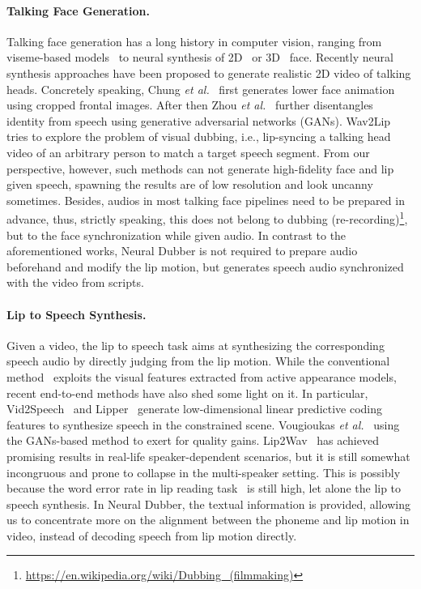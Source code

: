 \documentclass{article}
\begin{document}
\paragraph{Talking Face Generation.}
Talking face generation has a long history in computer vision, ranging from viseme-based models~\cite{edwards2016jali, zhou2018visemenet} to neural synthesis of 2D~\cite{suwajanakorn2017synthesizing, thies2020neural, wiles2018x2face} or 3D~\cite{karras2017audio, richard2021meshtalk, taylor2017deep} face. Recently neural synthesis approaches have been proposed to generate realistic 2D video of talking heads. Concretely speaking, Chung \textit{et al.}~\cite{chung2017you} first generates lower face animation using cropped frontal images. After then Zhou \textit{et al.}~\cite{zhou2019talking} further disentangles identity from speech using generative adversarial networks (GANs). Wav2Lip~\cite{prajwal2020lip} tries to explore the problem of visual dubbing, i.e., lip-syncing a talking head video of an arbitrary person to match a target speech segment. From our perspective, however, such methods can not generate high-fidelity face and lip given speech, spawning the results are of low resolution and look uncanny sometimes. 
Besides, audios in most talking face pipelines need to be prepared in advance, thus, strictly speaking, this does not belong to dubbing (re-recording)\footnote{\url{https://en.wikipedia.org/wiki/Dubbing_(filmmaking)}}, but to the face synchronization while given audio. In contrast to the aforementioned works, Neural Dubber is not required to prepare audio beforehand and modify the lip motion, but generates speech audio synchronized with the video from scripts.

\paragraph{Lip to Speech Synthesis.}
Given a video, the lip to speech task aims at synthesizing the corresponding speech audio by directly judging from the lip motion. While the conventional method~\cite{kello2004neural} exploits the visual features extracted from active appearance models, recent end-to-end methods have also shed some light on it. In particular, Vid2Speech~\cite{ephrat2017vid2speech} and Lipper~\cite{kumar2019lipper} generate low-dimensional linear predictive coding features to synthesize speech in the constrained scene. Vougioukas \textit{et al.}~\cite{vougioukas2020realistic} using the GANs-based method to exert for quality gains. Lip2Wav~\cite{prajwal2020learning} has achieved promising results in real-life speaker-dependent scenarios, but it is still somewhat incongruous and prone to collapse in the multi-speaker setting. This is possibly because the word error rate in lip reading task~\cite{afouras2018deep, assael2016lipnet, chung2017lip, Chung17a} is still high, let alone the lip to speech synthesis. In Neural Dubber, the textual information is provided, allowing us to concentrate more on the alignment between the phoneme and lip motion in video, instead of decoding speech from lip motion directly.
\end{document}
